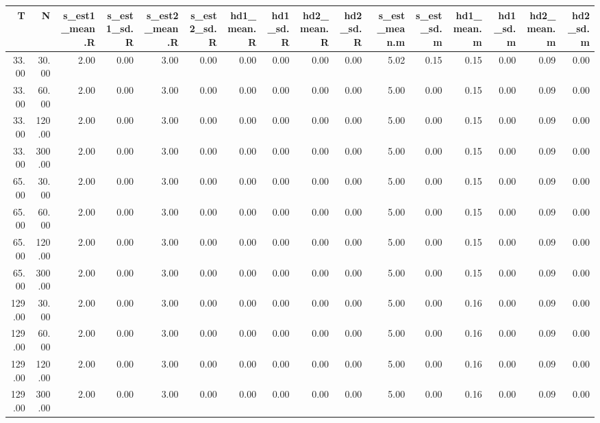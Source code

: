 \begin{table}[ht]
\centering
\begin{tabular}{rrrrrrrrrrrrrrrr}
  \hline
T & N & s\_est1\_mean.R & s\_est1\_sd.R & s\_est2\_mean.R & s\_est2\_sd.R & hd1\_mean.R & hd1\_sd.R & hd2\_mean.R & hd2\_sd.R & s\_est\_mean.m & s\_est\_sd.m & hd1\_mean.m & hd1\_sd.m & hd2\_mean.m & hd2\_sd.m \\ 
  \hline
33.00 & 30.00 & 2.00 & 0.00 & 3.00 & 0.00 & 0.00 & 0.00 & 0.00 & 0.00 & 5.02 & 0.15 & 0.15 & 0.00 & 0.09 & 0.00 \\ 
  33.00 & 60.00 & 2.00 & 0.00 & 3.00 & 0.00 & 0.00 & 0.00 & 0.00 & 0.00 & 5.00 & 0.00 & 0.15 & 0.00 & 0.09 & 0.00 \\ 
  33.00 & 120.00 & 2.00 & 0.00 & 3.00 & 0.00 & 0.00 & 0.00 & 0.00 & 0.00 & 5.00 & 0.00 & 0.15 & 0.00 & 0.09 & 0.00 \\ 
  33.00 & 300.00 & 2.00 & 0.00 & 3.00 & 0.00 & 0.00 & 0.00 & 0.00 & 0.00 & 5.00 & 0.00 & 0.15 & 0.00 & 0.09 & 0.00 \\ 
  65.00 & 30.00 & 2.00 & 0.00 & 3.00 & 0.00 & 0.00 & 0.00 & 0.00 & 0.00 & 5.00 & 0.00 & 0.15 & 0.00 & 0.09 & 0.00 \\ 
  65.00 & 60.00 & 2.00 & 0.00 & 3.00 & 0.00 & 0.00 & 0.00 & 0.00 & 0.00 & 5.00 & 0.00 & 0.15 & 0.00 & 0.09 & 0.00 \\ 
  65.00 & 120.00 & 2.00 & 0.00 & 3.00 & 0.00 & 0.00 & 0.00 & 0.00 & 0.00 & 5.00 & 0.00 & 0.15 & 0.00 & 0.09 & 0.00 \\ 
  65.00 & 300.00 & 2.00 & 0.00 & 3.00 & 0.00 & 0.00 & 0.00 & 0.00 & 0.00 & 5.00 & 0.00 & 0.15 & 0.00 & 0.09 & 0.00 \\ 
  129.00 & 30.00 & 2.00 & 0.00 & 3.00 & 0.00 & 0.00 & 0.00 & 0.00 & 0.00 & 5.00 & 0.00 & 0.16 & 0.00 & 0.09 & 0.00 \\ 
  129.00 & 60.00 & 2.00 & 0.00 & 3.00 & 0.00 & 0.00 & 0.00 & 0.00 & 0.00 & 5.00 & 0.00 & 0.16 & 0.00 & 0.09 & 0.00 \\ 
  129.00 & 120.00 & 2.00 & 0.00 & 3.00 & 0.00 & 0.00 & 0.00 & 0.00 & 0.00 & 5.00 & 0.00 & 0.16 & 0.00 & 0.09 & 0.00 \\ 
  129.00 & 300.00 & 2.00 & 0.00 & 3.00 & 0.00 & 0.00 & 0.00 & 0.00 & 0.00 & 5.00 & 0.00 & 0.16 & 0.00 & 0.09 & 0.00 \\ 
   \hline
\end{tabular}
\end{table}
